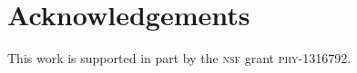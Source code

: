 \documentclass[12pt]{article}
\numberwithin{equation}{section}    %
\begin{document}
\section*{Acknowledgements}


This work is supported in part by the \textsc{nsf} grant \textsc{phy}-1316792. 
%


%  
% 
\end{document}
